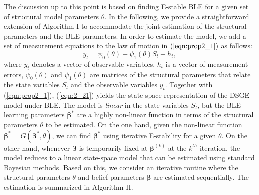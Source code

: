 The discussion up to this point is based on finding E-stable BLE for a given set of structural model parameters $\theta$. In the following,  we provide a straightforward extension of Algorithm I to accommodate  the joint estimation of the structural parameters and the BLE parameters.  In order to estimate the model, we add a set of measurement equations to the law of motion in $(\ref{eqn:prop2_1})$ as follows:
\begin{equation}
y_t = \psi_0(\theta)+\psi_1(\theta)S_t + h_t,
\label{eqn:2_21}
\end{equation}
where $y_t$ denotes a vector of observable variables, $h_t$ is a vector of measurement errors, $\psi_0(\theta)$ and $\psi_1(\theta)$ are matrices of the structural parameters that relate the  state variables $S_t$ and the observable variables $y_t$. Together with  (\ref{eqn:prop2_1}),  (\ref{eqn:2_21}) yields the state-space representation of the DSGE model under BLE. The model is \textit{linear} in the state variables $S_t$, but the BLE learning parameters $\pmb{\beta}^{*}$ are  a highly non-linear function in terms of the structural parameters $\theta$ to be estimated. On the one hand, given the non-linear function $\pmb{\beta}^{*} = G(\pmb{\beta}^{*}, \theta) $, we can find $\pmb{\beta}^{*}$ using iterative E-stability  for a given $\theta$. On the other hand, whenever $\pmb{\beta}$ is temporarily fixed at $\pmb{\beta}^{(k)}$ at the $k^{th}$ iteration, the model reduces to a linear state-space model that can be estimated using standard Bayesian methods. Based on this, we consider an iterative routine where the structural parameters $\theta$ and belief parameters $\pmb{\beta}$ are estimated sequentially. The estimation is summarized in Algorithm II.  

\FloatBarrier

